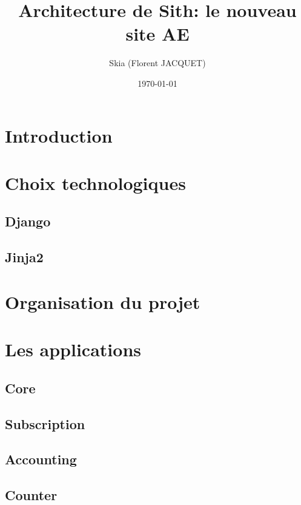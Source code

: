 \documentclass[a4paper]{report}
\title{Architecture de Sith: le nouveau site AE}
\author{Skia (Florent JACQUET)}
\date{\today}
\begin{document}
\tableofcontents
\listoffigures

\chapter*{Introduction}

\chapter{Choix technologiques}
\label{cha:choix_technologiques}

\section{Django}
\label{sec:django}

\section{Jinja2}
\label{sec:jinja2}


\chapter{Organisation du projet}
\label{cha:organisation_du_projet}




\chapter{Les applications}
\label{cha:les_applications}

\section{Core}
\label{sec:core}

\section{Subscription}
\label{sec:subscription}

\section{Accounting}
\label{sec:accounting}

\section{Counter}
\label{sec:counter}
\end{document}
